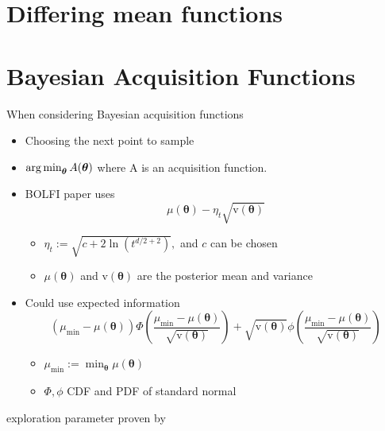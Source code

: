 \section{Differing mean functions}



\begin{figure}[htbp]
\end{figure}

\section{Bayesian Acquisition Functions}

When considering Bayesian acquisition functions



\begin{itemize}
    \item Choosing the next point to sample
    \item $\operatorname*{arg\,min}_{\bm{\theta}}A(\bm\theta)$ where A is an acquisition function.
    \item BOLFI paper uses $$\mu(\bm\theta) - \eta_t\sqrt{\mathrm{v}(\bm\theta)}$$ \begin{itemize}
              \item $\eta_t:= \sqrt{c + 2\ln(t^{d/2 + 2})},$ and $c$ can be chosen
              \item $\mu(\bm\theta)$ and $\mathrm{v}(\bm\theta)$ are the posterior mean and variance
          \end{itemize}

    \item Could use expected information
          $$
              (\mu_\text{min} - \mu(\bm\theta)) \varPhi \left(
              \frac{\mu_\text{min} - \mu(\bm\theta)}{\sqrt{\mathrm{v}(\bm\theta)}}
              \right)
              + \sqrt{\mathrm{v}(\bm\theta)}\phi\left(
              \frac{\mu_\text{min} - \mu(\bm\theta)}{\sqrt{\mathrm{v}(\bm\theta)}}
              \right)
          $$
          \begin{itemize}
              \item $\mu_\text{min} := \min_{\bm{\theta}} \mu(\bm\theta)$
              \item $\varPhi, \phi$ CDF and PDF of standard normal
          \end{itemize}
\end{itemize}
exploration parameter proven by \cite{srinivas_gaussian_2010}